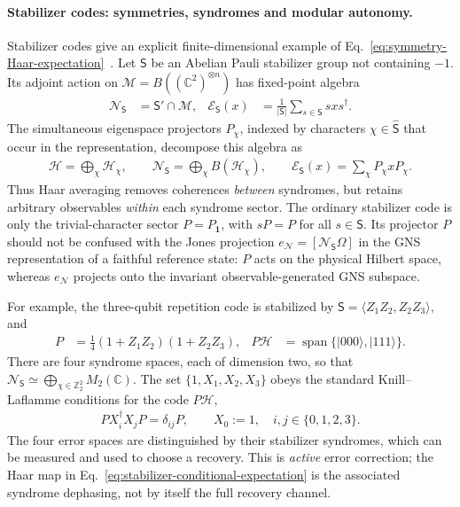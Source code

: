 \documentclass[a4paper,11pt]{article}
\theoremstyle{definition}
\newcommand{\cH}{\mathcal{H}}
\newcommand{\mN}{\mathcal{N}}
\newcommand{\mM}{\mathcal{M}}
\newcommand{\mE}{\mathcal{E}}
\begin{document}
\paragraph{Stabilizer codes: symmetries, syndromes and modular autonomy.}
Stabilizer codes give an explicit finite-dimensional example of
Eq.~\eqref{eq:symmetry-Haar-expectation}~\cite{Gottesman1997,KnillLaflamme1997}.
Let $\mathsf S$ be an Abelian Pauli stabilizer group not containing $-1$.
Its adjoint action on $\mM=B((\mathbb C^2)^{\otimes n})$ has fixed-point
algebra
\begin{align}
 \mN_{\mathsf S}&=\mathsf S'\cap\mM,
 &\mE_{\mathsf S}(x)&=\frac{1}{|\mathsf S|}
                    \sum_{s\in\mathsf S}sxs^\dagger .
 \label{eq:stabilizer-conditional-expectation}
\end{align}
The simultaneous eigenspace projectors $P_\chi$, indexed by characters
$\chi\in\widehat{\mathsf S}$ that occur in the representation, decompose
this algebra as
\begin{align}
 \cH=\bigoplus_{\chi}\cH_\chi,
 \qquad
 \mN_{\mathsf S}=\bigoplus_{\chi}B(\cH_\chi),
 \qquad
 \mE_{\mathsf S}(x)=\sum_\chi P_\chi xP_\chi .
 \label{eq:stabilizer-syndrome-decomposition}
\end{align}
Thus Haar averaging removes coherences \emph{between} syndromes, but
retains arbitrary observables \emph{within} each syndrome sector. The
ordinary stabilizer code is only the trivial-character sector
$P=P_{\mathbf1}$, with $sP=P$ for all $s\in\mathsf S$. Its projector $P$
should not be confused with the Jones projection
$e_{\mN}=[\mN_{\mathsf S}\Omega]$ in the GNS representation of a faithful
reference state: $P$ acts on the physical Hilbert space, whereas $e_{\mN}$
projects onto the invariant observable-generated GNS subspace.

For example, the three-qubit repetition code is stabilized by
$\mathsf S=\langle Z_1Z_2,Z_2Z_3\rangle$, and
\begin{align}
 P&=\tfrac14(1+Z_1Z_2)(1+Z_2Z_3),
 &P\cH&=\operatorname{span}\{|000\rangle,|111\rangle\}.
 \label{eq:three-qubit-code}
\end{align}
There are four syndrome spaces, each of dimension two, so that
$\mN_{\mathsf S}\simeq\bigoplus_{\chi\in\mathbb Z_2^2}M_2(\mathbb C)$.
The set $\{1,X_1,X_2,X_3\}$ obeys the standard Knill--Laflamme
conditions for the code $P\cH$,
\begin{align}
 P X_i^\dagger X_jP=\delta_{ij}P,
 \qquad X_0:=1,
 \quad i,j\in\{0,1,2,3\} .
 \label{eq:repetition-KL}
\end{align}
The four error spaces are distinguished by their stabilizer syndromes,
which can be measured and used to choose a recovery. This is \emph{active}
error correction; the Haar map in
Eq.~\eqref{eq:stabilizer-conditional-expectation} is the associated
syndrome dephasing, not by itself the full recovery channel.
\end{document}
